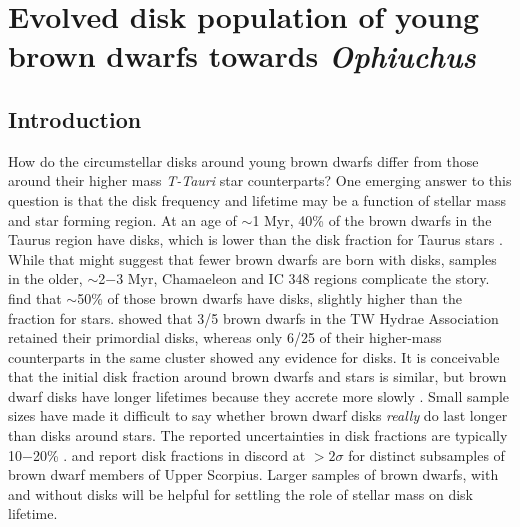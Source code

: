 \chapter{Evolved disk population of young brown dwarfs towards \emph{Ophiuchus}}

\section{Introduction}

How do the circumstellar disks around young brown dwarfs differ from those around their higher mass \emph{T-Tauri} star counterparts?  One emerging answer to this question is that the disk frequency and lifetime may be a function of stellar mass and star forming region.  At an age of $\sim$1 Myr, 40\% of the brown dwarfs in the Taurus region have disks, which is lower than the disk fraction for Taurus stars \citep{2006ApJ...645..676L}.  While that might suggest that fewer brown dwarfs are born with disks, samples in the older, $\sim$2$-$3 Myr, Chamaeleon and IC 348 regions complicate the story.  \citet{2005ApJ...631L..69L} find that $\sim$50\% of those brown dwarfs have disks, slightly higher than the fraction for stars.  \citet{2008ApJ...681.1584R} showed that 3/5 brown dwarfs in the TW Hydrae Association retained their primordial disks, whereas only 6/25 of their higher-mass counterparts in the same cluster showed any evidence for disks.  It is conceivable that the initial disk fraction around brown dwarfs and stars is similar, but brown dwarf disks have longer lifetimes because they accrete more slowly \citep{2007ApJ...657..511A}.  Small sample sizes have made it difficult to say whether brown dwarf disks \emph{really} do last longer than disks around stars.  The reported uncertainties in disk fractions are typically 10$-$20\% \citep{2012MNRAS.420.2497R}.  \citet{2007ApJ...660.1517S} and \citet{2009ApJ...705.1173R} report disk fractions in discord at $>2\sigma$ for distinct subsamples of brown dwarf members of Upper Scorpius.  Larger samples of brown dwarfs, with and without disks will be helpful for settling the role of stellar mass on disk lifetime.  


